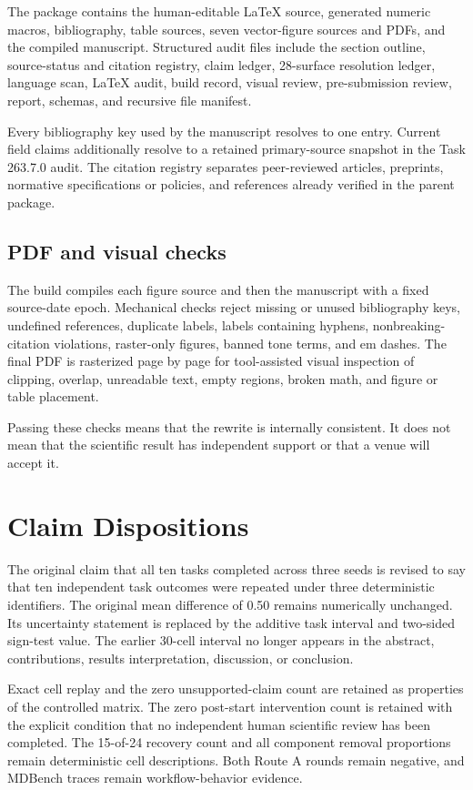 The package contains the human-editable LaTeX source, generated numeric
macros, bibliography, table sources, seven vector-figure sources and PDFs,
and the compiled manuscript. Structured audit files include the section
outline, source-status and citation registry, claim ledger, 28-surface
resolution ledger, language scan, LaTeX audit, build record, visual review,
pre-submission review, report, schemas, and recursive file manifest.

Every bibliography key used by the manuscript resolves to one entry. Current
field claims additionally resolve to a retained primary-source snapshot in
the Task 263.7.0 audit. The citation registry separates peer-reviewed
articles, preprints, normative specifications or policies, and references
already verified in the parent package.

\subsection{PDF and visual checks}

The build compiles each figure source and then the manuscript with a fixed
source-date epoch. Mechanical checks reject missing or unused bibliography
keys, undefined references, duplicate labels, labels containing hyphens,
nonbreaking-citation violations, raster-only figures, banned tone terms, and
em dashes. The final PDF is rasterized page by page for tool-assisted visual
inspection of clipping, overlap, unreadable text, empty regions, broken math,
and figure or table placement.

Passing these checks means that the rewrite is internally consistent. It does
not mean that the scientific result has independent support or that a venue
will accept it.

\section{Claim Dispositions}
\label{sec:claim_dispositions}

The original claim that all ten tasks completed across three seeds is revised
to say that ten independent task outcomes were repeated under three
deterministic identifiers. The original mean difference of 0.50 remains
numerically unchanged. Its uncertainty statement is replaced by the additive
task interval and two-sided sign-test value. The earlier 30-cell interval no
longer appears in the abstract, contributions, results interpretation,
discussion, or conclusion.

Exact cell replay and the zero unsupported-claim count are retained as
properties of the controlled matrix. The zero post-start intervention count
is retained with the explicit condition that no independent human scientific
review has been completed. The 15-of-24 recovery count and all component
removal proportions remain deterministic cell descriptions. Both Route A
rounds remain negative, and MDBench traces remain workflow-behavior evidence.

